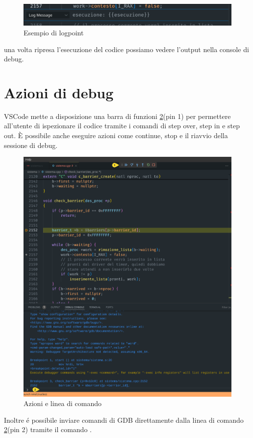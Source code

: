 \begin{figure}[H]
    \centering
    \includegraphics[width=0.7\columnwidth]{images/logpoint.png}
    \caption{Esempio di logpoint}
    \label{fig:logpoint}
\end{figure}

una volta ripresa l'esecuzione del codice possiamo vedere l'output nella console di debug.

\section{Azioni di debug}

VSCode mette a disposizione una barra di funzioni \ref*{fig:middleDebug}(pin 1) per permettere all'utente di ispezionare il codice tramite i comandi di step over, step in e step out. È possibile anche eseguire azioni come continue, stop e il riavvio della sessione di debug.  

\begin{figure}[H]
    \centering
    \includegraphics[width=0.8\columnwidth]{images/middle_debug.png}
    \caption{Azioni e linea di comando}
    \label{fig:middleDebug}
\end{figure}

Inoltre é possibile inviare comandi di GDB direttamente dalla linea di comando \ref*{fig:middleDebug}(pin 2) tramite il comando .

